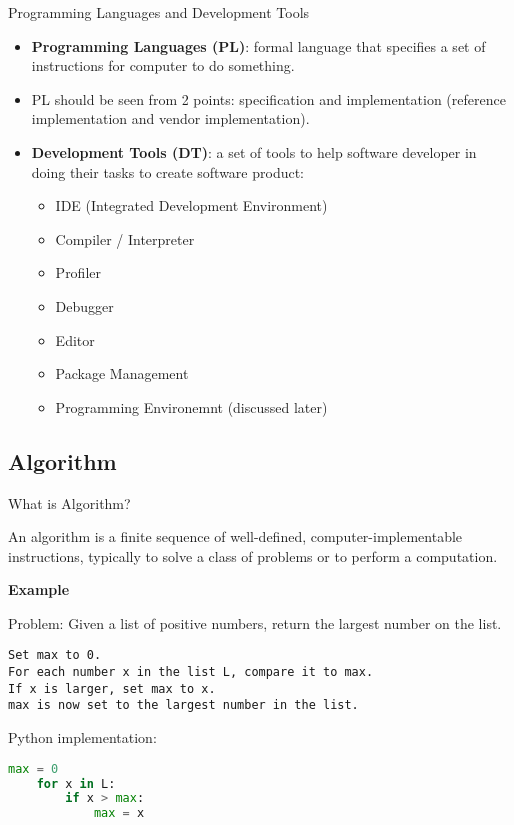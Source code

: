 \documentclass[10pt]{beamer}
\begin{document}
    \begin{frame}[fragile]{Programming Languages and Development Tools}

      \begin{itemize}
        \item \textbf{Programming Languages (PL)}: formal language that specifies a set of instructions for computer to do something.
        \item PL should be seen from 2 points: specification and implementation (reference
          implementation and vendor implementation).
        \item \textbf{Development Tools (DT)}: a set of tools to help software developer in doing their tasks to create software product:
          \begin{itemize}
            \item IDE (Integrated Development Environment)
            \item Compiler / Interpreter
            \item Profiler
            \item Debugger
            \item Editor
            \item Package Management
            \item Programming Environemnt (discussed later)
          \end{itemize}
      \end{itemize}

    \end{frame}

  \subsection{Algorithm}

    \begin{frame}[fragile]{What is Algorithm?}

An algorithm is a finite sequence of well-defined, computer-implementable instructions, typically to
solve a class of problems or to perform a computation.

\textbf{Example}

Problem: Given a list of positive numbers, return the largest number on the list.

\begin{lstlisting}
Set max to 0.
For each number x in the list L, compare it to max. 
If x is larger, set max to x.
max is now set to the largest number in the list.
\end{lstlisting}

Python implementation:

\begin{lstlisting}[language=python]
    max = 0
    for x in L:
        if x > max:
            max = x
\end{lstlisting}

    \end{frame}
\end{document}
